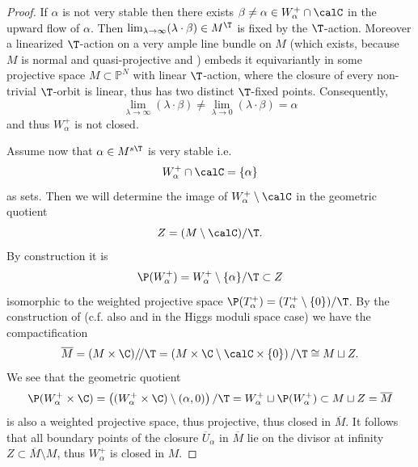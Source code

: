 \begin{proof}If $\alpha$ is not very stable then there exists  $\beta\neq\alpha \in W^+_\alpha\cap \calC$  in the upward flow of $
	\alpha$. Then $\lim_{\lambda\to \infty}(\lambda\cdot \beta)\in M^\T$ is fixed by the $\T$-action. Moreover a linearized $\T$-action on a very ample line bundle on $M$ (which exists, because $M$ is normal and quasi-projective and \cite[Corollary 7.2]{dolgachev}) embeds it equivariantly in some projective space $M\subset {\mathbb P}^N$ with linear $\T$-action, where the closure of every non-trivial $\T$-orbit is linear, thus has two distinct $\T$-fixed points. Consequently, $$\lim_{\lambda\to \infty}(\lambda\cdot \beta)\neq\lim_{\lambda\to 0}(\lambda\cdot \beta)=\alpha$$and thus $W^+_\alpha$ is not closed.

	Assume now that $\alpha\in M^{s\T}$ is very stable i.e. $$W^+_{\alpha}\cap \calC=\{\alpha\}$$ as sets.  Then we will determine the image of  $W^+_\alpha\setminus \calC$ in the geometric quotient $$Z=(M\setminus \calC)/\T.$$ By construction it is $$\P(W^+_\alpha)=W^+_\alpha\setminus \{\alpha\}/\T\subset Z$$  isomorphic to the  weighted projective space $\P(T_\alpha^+)=(T_\alpha^+\setminus \{0\})/\T$. By the construction of
	\cite[(1.2.3)]{hausel-large} (c.f. also \cite[\S 11]{simpson3} and \cite{hausel-compact} in the Higgs moduli space case) we have the compactification $$\overline{M}=(M\times\C)/\! /\T=\left(M\times\C\setminus \calC\times\{0\}\right)/\T\cong M\sqcup Z.$$ We
	see that the geometric quotient $$\P(W^+_\alpha\times \C)= \left((W^+_\alpha\times \C)\setminus (\alpha,0)\right)/\T= W^+_\alpha\sqcup \P(W^+_\alpha) \subset M\sqcup Z = \overline{M}$$ is also a weighted projective space, thus projective, thus closed in $\overline{M}$. It follows that all boundary points of the closure $\overline{U}_\alpha$ in $\overline{M}$ lie on the divisor at infinity $Z\subset \overline{M}\setminus M$, thus $W^+_\alpha$ is closed in $M$.
\end{proof}
